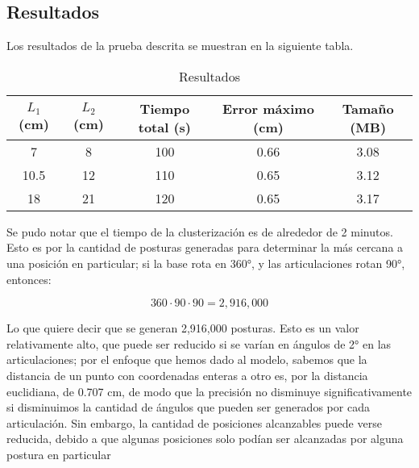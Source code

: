 \subsection{Resultados}

Los resultados de la prueba descrita se muestran en la siguiente tabla.

\begin{table}[ht]
	\centering
	\begin{tabular}{|c|c|c|c|c|}
		\hline
		\textbf{$L_1$ (cm)} & \textbf{$L_2$ (cm)} & \textbf{Tiempo total (s)} & \textbf{Error máximo (cm)} & \textbf{Tamaño (MB)} \\
		\hline
		7 & 8 & 100 & 0.66 & 3.08 \\
		10.5 & 12 & 110 & 0.65 & 3.12 \\
		18 & 21 & 120 & 0.65 & 3.17 \\
		\hline
	\end{tabular}
	\caption{Resultados}
\end{table}

Se pudo notar que el tiempo de la clusterización es de alrededor de 2 minutos. Esto es por la cantidad de posturas generadas para determinar la más cercana a una posición en particular; si la base rota en 360°, y las articulaciones rotan 90°, entonces:

\begin{equation}
	360 \cdot 90 \cdot 90 = 2,916,000
\end{equation}

Lo que quiere decir que se generan 2,916,000 posturas. Esto es un valor relativamente alto, que puede ser reducido si se varían en ángulos de 2° en las articulaciones; por el enfoque que hemos dado al modelo, sabemos que la distancia de un punto con coordenadas enteras a otro es, por la distancia euclidiana, de 0.707 cm, de modo que la precisión no disminuye significativamente si disminuimos la cantidad de ángulos que pueden ser generados por cada articulación. Sin embargo, la cantidad de posiciones alcanzables puede verse reducida, debido a que algunas posiciones solo podían ser alcanzadas por alguna postura en particular